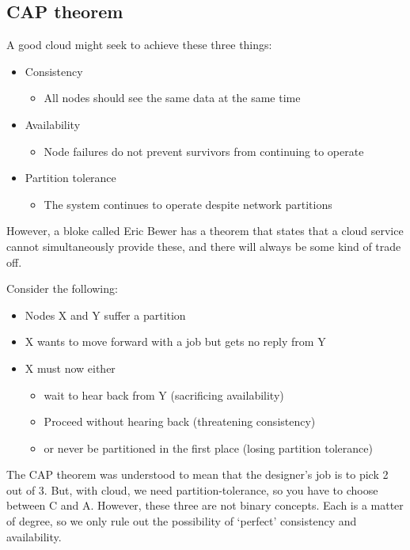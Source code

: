 \documentclass[11pt,a4paper,titlepage,dvipsnames,cmyk]{scrartcl}
\begin{document}
\subsection{CAP theorem}
A good cloud might seek to achieve these three things:
\begin{itemize}
    \item Consistency
    \begin{itemize}
        \item All nodes should see the same data at the same time
    \end{itemize}
    \item Availability
    \begin{itemize}
        \item Node failures do not prevent survivors from continuing to operate
    \end{itemize}
    \item Partition tolerance
    \begin{itemize}
        \item The system continues to operate despite network partitions
    \end{itemize}
\end{itemize}

However, a bloke called Eric Bewer has a theorem that states that a cloud service cannot simultaneously provide these, and there will always be some kind of trade off.

Consider the following:
\begin{itemize}
    \item Nodes X and Y suffer a partition
    \item X wants to move forward with a job but gets no reply from Y
    \item X must now either
    \begin{itemize}
        \item wait to hear back from Y (sacrificing availability)
        \item Proceed without hearing back (threatening consistency)
        \item or never be partitioned in the first place (losing partition tolerance)
    \end{itemize}
\end{itemize}

The CAP theorem was understood to mean that the designer's job is to pick 2 out of 3. But, with cloud, we need partition-tolerance, so you have to choose between C and A. However, these three are not binary concepts. Each is a matter of degree, so we only rule out the possibility of `perfect' consistency and availability.
\end{document}
